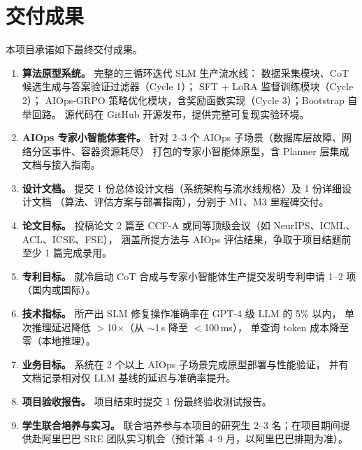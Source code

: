 \documentclass[lang=cn,a4paper,newtx,bibend=bibtex]{elegantpaper}
\begin{document}
\section{交付成果}

本项目承诺如下最终交付成果。

\begin{enumerate}[leftmargin=*, itemsep=4pt]
  \item \textbf{算法原型系统。}
        完整的三循环迭代 SLM 生产流水线：
        数据采集模块、CoT 候选生成与答案验证过滤器（Cycle 1）；
        SFT + LoRA 监督训练模块（Cycle 2）；
        AIOps-GRPO 策略优化模块，含奖励函数实现（Cycle 3）；Bootstrap 自举回路。
        源代码在 GitHub 开源发布，提供完整可复现实验环境。
  \item \textbf{AIOps 专家小智能体套件。}
        针对 2--3 个 AIOps 子场景（数据库层故障、网络分区事件、容器资源耗尽）
        打包的专家小智能体原型，含 Planner 层集成文档与接入指南。
  \item \textbf{设计文档。}
        提交 1 份总体设计文档（系统架构与流水线规格）及 1 份详细设计文档
        （算法、评估方案与部署指南），分别于 M1、M3 里程碑交付。
  \item \textbf{论文目标。}
        投稿论文 2 篇至 CCF-A 或同等顶级会议（如 NeurIPS、ICML、ACL、ICSE、FSE），
        涵盖所提方法与 AIOps 评估结果，争取于项目结题前至少 1 篇完成录用。
  \item \textbf{专利目标。}
        就冷启动 CoT 合成与专家小智能体生产提交发明专利申请 1--2 项（国内或国际）。
  \item \textbf{技术指标。}
        所产出 SLM 修复操作准确率在 GPT-4 级 LLM 的 5\% 以内，
        单次推理延迟降低 $>$10$\times$（从 $\sim$1\,s 降至 $<$100\,ms），
        单查询 token 成本降至零（本地推理）。
  \item \textbf{业务目标。}
        系统在 2 个以上 AIOps 子场景完成原型部署与性能验证，
        并有文档记录相对仅 LLM 基线的延迟与准确率提升。
  \item \textbf{项目验收报告。}
        项目结束时提交 1 份最终验收测试报告。
  \item \textbf{学生联合培养与实习。}
        联合培养参与本项目的研究生 2--3 名；在项目期间提供赴阿里巴巴
        SRE 团队实习机会（预计第 4--9 月，以阿里巴巴排期为准）。
\end{enumerate}
\end{document}
